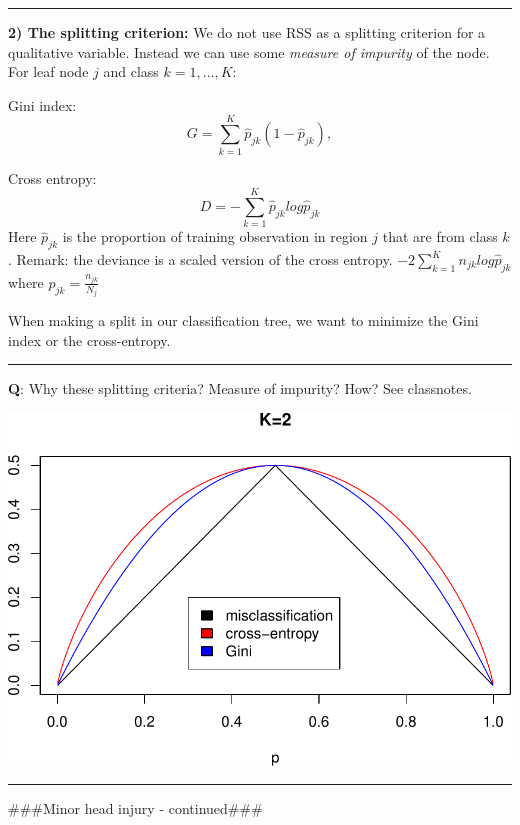 \documentclass[]{article}
\begin{document}
\begin{center}\rule{0.5\linewidth}{\linethickness}\end{center}

\textbf{2) The splitting criterion:} We do not use RSS as a splitting
criterion for a qualitative variable. Instead we can use some
\emph{measure of impurity} of the node. For leaf node \(j\) and class
\(k=1,\ldots, K\):

Gini index: \[
G=\sum_{k=1}^K \hat{p}_{jk}(1-\hat{p}_{jk}),
\]

Cross entropy: \[
D=-\sum_{k=1}^K \hat{p}_{jk}log\hat{p}_{jk}
\] Here \(\hat{p}_{jk}\) is the proportion of training observation in
region \(j\) that are from class \(k\). Remark: the deviance is a scaled
version of the cross entropy. \(-2\sum_{k=1}^K n_{jk} log\hat{p}_{jk}\)
where \(\hat{p}_{jk}=\frac{n_{jk}}{N_j}\)

When making a split in our classification tree, we want to minimize the
Gini index or the cross-entropy.

\begin{center}\rule{0.5\linewidth}{\linethickness}\end{center}

\textbf{Q}: Why these splitting criteria? Measure of impurity? How? See
classnotes.

\includegraphics{8Trees_files/figure-latex/unnamed-chunk-11-1.pdf}

\begin{center}\rule{0.5\linewidth}{\linethickness}\end{center}

\#\#\#Minor head injury - continued\#\#\#
\end{document}
